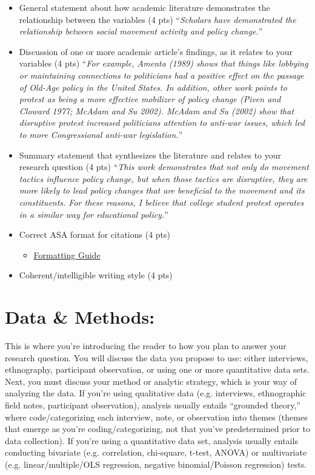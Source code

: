 \documentclass{article}
\begin{document}
\begin{itemize}
\item General statement about how academic literature demonstrates the relationship between the variables (4 pts)
\newline ``{\it{{\color{red}Scholars have demonstrated the relationship between social movement activity and policy change.}}}''
\item Discussion of one or more academic article's findings, as it relates to your variables (4 pts)
\newline ``{\it{{\color{red}For example, Amenta (1989) shows that things like lobbying or maintaining connections to politicians had a positive effect on the passage of Old-Age policy in the United States. In addition, other work points to protest as being a more effective mobilizer of policy change (Piven and Cloward 1977; McAdam and Su 2002). McAdam and Su (2002) show that disruptive protest increased politicians attention to anti-war issues, which led to more Congressional anti-war legislation.}}}''
\item Summary statement that synthesizes the literature and relates to your research question (4 pts)
\newline ``{\it{{\color{red}This work demonstrates that not only do movement tactics influence policy change, but when those tactics are disruptive, they are more likely to lead policy changes that are beneficial to the movement and its constituents. For these reasons, I believe that college student protest operates in a similar way for educational policy.}}}''
\item Correct ASA format for citations (4 pts)
	\begin{itemize}
	\item \href{https://owl.english.purdue.edu/owl/resource/583/02/}{Formatting Guide}
	\end{itemize}
\item Coherent/intelligible writing style (4 pts)
\end{itemize}

\section*{Data \& Methods:}
This is where you're introducing the reader to how you plan to answer your research question. You will discuss the data you propose to use: either interviews, ethnography, participant observation, or using one or more quantitative data sets. Next, you must discuss your method or analytic strategy, which is your way of analyzing the data. If you're using qualitative data (e.g. interviews, ethnographic field notes, participant observation), analysis usually entails ``grounded theory,'' where code/categorizing each interview, note, or observation into themes (themes that emerge as you're coding/categorizing, not that you've predetermined prior to data collection). If you're using a quantitative data set, analysis usually entails conducting bivariate (e.g. correlation, chi-square, t-test, ANOVA) or multivariate (e.g. linear/multiple/OLS regression, negative binomial/Poisson regression) tests.
\end{document}
